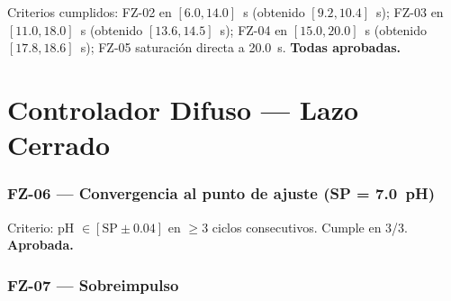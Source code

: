 \noindent Criterios cumplidos: FZ-02 en $[6.0, 14.0]$~s (obtenido $[9.2, 10.4]$~s);
FZ-03 en $[11.0, 18.0]$~s (obtenido $[13.6, 14.5]$~s);
FZ-04 en $[15.0, 20.0]$~s (obtenido $[17.8, 18.6]$~s);
FZ-05 saturación directa a 20.0~s. \textbf{Todas aprobadas.}

\section{Controlador Difuso --- Lazo Cerrado}

\subsubsection*{FZ-06 --- Convergencia al punto de ajuste (SP = 7.0~pH)}

\begin{table}[H]
\centering
\caption{Convergencia del pH al SP en lazo cerrado.}
\label{tab:fz06}
\renewcommand{\arraystretch}{1.3}\small
{}
\end{table}

\noindent Criterio: pH $\in [\text{SP}\pm 0.04]$ en $\geq 3$ ciclos consecutivos.
Cumple en 3/3. \textbf{Aprobada.}

\subsubsection*{FZ-07 --- Sobreimpulso}

\begin{table}[H]
\centering
\caption{Sobreimpulso máximo observado en lazo cerrado.}
\label{tab:fz07}
\renewcommand{\arraystretch}{1.3}\small
{}
\end{table}

